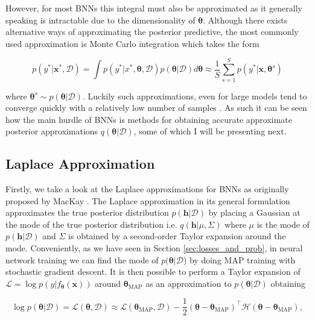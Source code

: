 \noindent However, for most BNNs this integral must also be approximated as it generally speaking is intractable due to the dimensionality of $\bm{\theta}$. Although there exists alternative ways of approximating the posterior predictive, the most commonly used approximation is Monte Carlo integration which takes the form

\begin{equation}
    p(y^*|\mathbf{x}^*, \mathcal{D}) = \int p(y^*|x^*, \bm{\theta}, \mathcal{D})p(\bm{\theta}|\mathcal{D})d\bm{\theta} \approx \frac{1}{S}\sum^S_{s=1}p(y^*|\mathbf{x},\bm{\theta}^s)
\end{equation}

\noindent where $\bm{\theta}^s\sim p(\bm{\theta}|\mathcal{D})$. Luckily such approximations, even for large models tend to converge quickly with a relatively low number of samples \citep{2003_MacKayBNN}. As such it can be seen how the main hurdle of BNNs is methods for obtaining accurate approximate posterior approximations $q(\bm{\theta}|\mathcal{D})$, some of which I will be presenting next.

\subsection{Laplace Approximation}
\label{sec:LAPLACE}
Firstly, we take a look at the Laplace approximations for BNNs as originally proposed by MacKay \citep{1992_MacKay}. The Laplace approximation \citep{1774_Laplace} in its general formulation approximates the true posterior distribution $p(\mathbf{h}|\mathcal{D})$ by placing a Gaussian at the mode of the true posterior distribution i.e. $q(\mathbf{h}|\mu, \Sigma)$ where $\mu$ is the mode of $p(\mathbf{h}|\mathcal{D})$ and $\Sigma$ is obtained by a second-order Taylor expansion around the mode. Conveniently, as we have seen in Section \ref{sec:losses_and_prob}, in neural network training we can find the mode of $p(\bm{\theta}|\mathcal{D}$) by doing MAP training with stochastic gradient descent. It is then possible to perform a Taylor expansion of $\mathcal{L}=\log p(y|f_{\bm\theta}(\mathbf{x}))$ around $\bm{\theta}_{\text{MAP}}$ as an approximation to $p(\bm{\theta}|\mathcal{D})$ obtaining

\begin{equation}
    \log p(\bm{\theta}|\mathcal{D})=\mathcal{L}(\bm{\theta}, \mathcal{D}) \approx \mathcal{L}(\bm{\theta}_{\text{MAP}}, \mathcal{D}) - \frac{1}{2}(\bm{\theta}-\bm{\theta}_{\text{MAP}})^\top \mathcal{H} (\bm{\theta}-\bm{\theta}_{\text{MAP}}),
    \label{eq:laplace_approx_bnn}
\end{equation}

